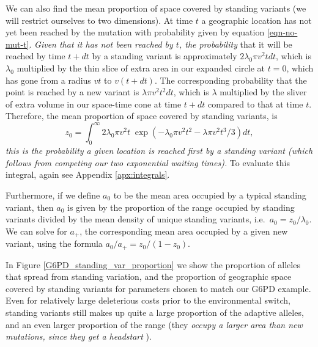 \documentclass{article}
\newcommand{\mfp}[1]{{\it\color{red} #1} }
\begin{document}
We can also find the mean proportion of space covered by standing
variants (we will restrict ourselves to two dimensions).
At time $t$ a geographic location has not yet been reached by the
mutation with probability given by equation \eqref{eqn-no-mut-t}.
\mfp{Given that it has not been reached by $t$, the probability} that it will be reached by time $t+dt$ 
by a standing variant is approximately $2 \lambda_0 \pi v^2 t dt$,
which is $\lambda_0$ multiplied by the thin slice of extra area in our
expanded circle at $t=0$, which has gone from a radius $vt$ to
$v(t+dt)$. The corresponding probability that the point is reached by a new
variant is 
$\lambda \pi v^2 t^2 dt$, which is $\lambda$ multiplied by the
sliver of  extra volume in our space-time cone at time $t+dt$ compared to that at time $t$.
Therefore, the mean proportion of space covered by standing variants,
is
\begin{equation} \label{prop_space_standing}
    z_0 = \int_0^\infty {2 \lambda_0 \pi v^2 t} \; \exp \left( -
      \lambda_0 \pi v^2 t^2 - \lambda \pi v^2 t^3 / 3 \right) dt,
\end{equation}
\mfp{this is the probability a given location is reached first by a
standing variant (which follows from competing our two exponential
waiting times).}
To evaluate this integral, again see Appendix \ref{apx:integrals}.

Furthermore, if we define $a_0$ to be the mean area occupied by a typical standing variant, 
then $a_0$ is given by the proportion of the range occupied by standing variants divided by the mean density of unique standing variants,
i.e.\ $a_0 = z_0 / \lambda_0$.
We can solve for $a_+$, the corresponding mean area occupied by a given new variant, 
using the formula $a_0 / a_+ = z_0 / (1-z_0)$.

In Figure \ref{G6PD_standing_var_proportion} we show the proportion of
alleles that spread from standing variation, and the proportion of
geographic space covered by standing variants for parameters chosen to match our G6PD example.
Even for relatively large deleterious costs prior to the environmental switch, 
standing variants still makes up quite a large proportion of the adaptive alleles, 
and an even larger proportion of the range 
(they \mfp{occupy a larger area than new mutations, since they get a
headstart}).
\end{document}
